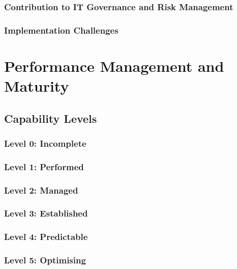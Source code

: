 
\subsubsection{Contribution to IT Governance and Risk Management}

\subsubsection{Implementation Challenges}


\section{Performance Management and Maturity}


\subsection{Capability Levels}

\subsubsection{Level 0: Incomplete}

\subsubsection{Level 1: Performed}

\subsubsection{Level 2: Managed}

\subsubsection{Level 3: Established}

\subsubsection{Level 4: Predictable}

\subsubsection{Level 5: Optimising}


